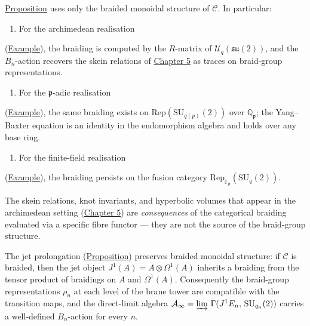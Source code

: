 \begin{remark}
  \label{rem:braid-base-field}
\hyperref[prop:braid-action-tensor]{Proposition} uses only the braided monoidal
structure of $\mathcal{C}$.  In particular:

\begin{enumerate}
  \item For the archimedean realisation
\end{enumerate}
   (\hyperref[def:c-quantum-observable-universe]{Example}), the braiding
   is computed by the $R$-matrix of
   $\mathcal{U}_q(\mathfrak{su}(2))$, and the $B_n$-action
   recovers the skein relations of \hyperref[chap:experimental]{Chapter 5}
   as traces on braid-group representations.
\begin{enumerate}
  \item For the $\mathfrak{p}$-adic realisation
\end{enumerate}
   (\hyperref[ex:p-adic-realisation]{Example}), the same braiding exists
   on $\mathrm{Rep}(\mathrm{SU}_{q(p)}(2))$ over
   $\mathbb{Q}_\mathfrak{p}$; the Yang--Baxter equation is an identity in
   the endomorphism algebra and holds over any base ring.
\begin{enumerate}
  \item For the finite-field realisation
\end{enumerate}
   (\hyperref[ex:finite-field-realisation]{Example}), the braiding
   persists on the fusion category
   $\mathrm{Rep}_{\mathbb{F}_\mathfrak{p}}(\mathrm{SU}_q(2))$.

The skein relations, knot invariants, and hyperbolic volumes that appear
in the archimedean setting (\hyperref[chap:experimental]{Chapter 5}) are
\emph{consequences} of the categorical braiding evaluated via a specific
fibre functor --- they are not the source of the braid-group structure.
\end{remark}

\begin{remark}
  \label{rem:braid-lifting-compatibility}
The jet prolongation (\hyperref[prop:jet-prolongation]{Proposition}) preserves
braided monoidal structure: if $\mathcal{C}$ is braided, then the jet
object $J^1(A) = A \otimes \Omega^1(A)$ inherits a braiding from the
tensor product of braidings on $A$ and $\Omega^1(A)$.  Consequently the
braid-group representations $\rho_n$ at each level of the brane tower are
compatible with the transition maps, and the direct-limit algebra
$\mathcal{A}_\infty = \varinjlim\,\Gamma(J^1 E_n,\,
\mathrm{SU}_{q_n}(2))$ carries a well-defined $B_n$-action for
every $n$.
\end{remark}

